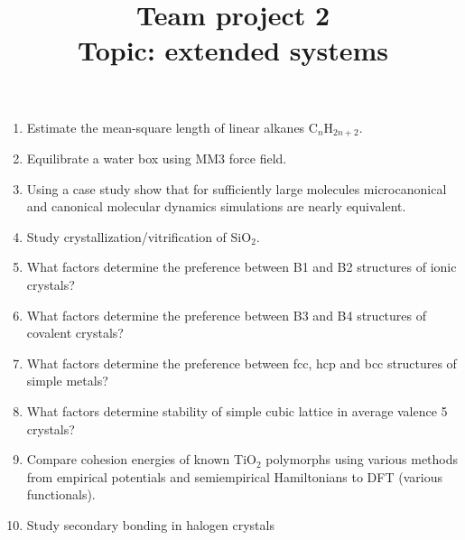 \documentclass{Project}
\begin{document}
\title{Team project 2 \\ Topic: extended systems}
\maketitle

\preface{}

\begin{enumerate}
\item Estimate the mean-square length of linear alkanes C$_n$H$_{2n+2}$.
\item Equilibrate a water box using MM3 force field.
\item Using a case study show that for sufficiently large molecules microcanonical and canonical molecular dynamics simulations are nearly equivalent.
\item Study crystallization/vitrification of SiO$_2$.
\item What factors determine the preference between B1 and B2 structures of ionic crystals?
\item What factors determine the preference between B3 and B4 structures of covalent crystals?
\item What factors determine the preference between fcc, hcp and bcc structures of simple metals?
\item What factors determine stability of simple cubic lattice in average valence 5 crystals?
\item Compare cohesion energies of known TiO$_2$ polymorphs using various methods from empirical potentials and semiempirical Hamiltonians to DFT (various functionals).
\item Study secondary bonding in halogen crystals
\end{enumerate}

\reminder{}
\end{document}
